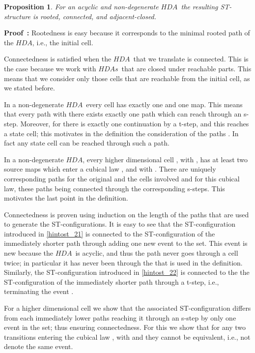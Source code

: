 \documentclass[submission,copyright,creativecommons]{eptcs}
\newtheorem{proposition}[theorem]{Proposition}
\newenvironment{proof}[1][\!\!\,]{\vspace{1ex}\noindent\textbf{Proof #1: }}{\hfill\vspace{2ex}}
\newcounter{case}
\newcommand\HDA{\ensuremath{\mathit{HDA}}}
\newcommand\HDAs{\ensuremath{\mathit{HDAs}}}
\begin{document}
\begin{proposition}\label{prop_hdaintost}
For an acyclic and non-degenerate \HDA\ the resulting ST-structure  is rooted, connected, and adjacent-closed.
\end{proposition}

\begin{proof}
Rootedness is easy because it corresponds to the minimal rooted path of the \HDA, i.e., the initial cell.

Connectedness is satisfied when the \HDA\ that we translate is connected. This is the case because we work with \HDAs\ that are closed under reachable parts. This means that we consider only those cells that are reachable from the initial cell, as we stated before.

In a non-degenerate \HDA\ every  cell has exactly one  and one  map. This means that every path  with  there exists exactly one path  which can reach  through an s-step. Moreover, for  there is exactly one continuation by a t-step, and this reaches a  state cell; this motivates in the definition the consideration of the paths . In fact any state cell  can be reached through such a path.

In a non-degenerate \HDA, every higher dimensional cell , with , has at least two source maps which enter a cubical law , and with . There are uniquely corresponding paths for the original  and the cells involved and for this cubical law, these paths being connected through the corresponding s-steps. This motivates the last point in the definition.

Connectedness is proven using induction on the length of the paths that are used to generate the ST-configurations.
It is easy to see that the ST-configuration introduced in \ref{hintost_21} is connected to the ST-configuration of the immediately shorter path through adding one new event to the  set. This event is new because the \HDA\ is acyclic, and thus the path  never goes through a cell twice; in particular it has never been through the  that is used in the definition.
Similarly, the ST-configuration introduced in \ref{hintost_22} is connected to the the ST-configuration of the immediately shorter path through a t-step, i.e., terminating the event .

For a higher dimensional cell  we show that the associated ST-configuration differs from each immediately lower paths reaching it through an s-step by only one event in the  set; thus ensuring connectedness.
For this we show that for any two transitions  entering the cubical law , with  and  they cannot be equivalent, i.e., not denote the same event.




\end{proof}
\end{document}
